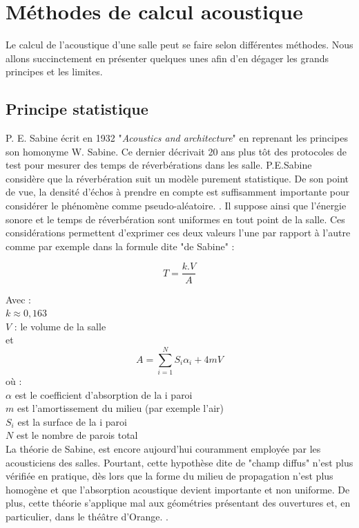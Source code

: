 \section{Méthodes de calcul acoustique} 
Le calcul de l'acoustique d'une salle peut se faire selon différentes méthodes. Nous allons succinctement en présenter quelques unes afin d'en dégager les grands principes et les limites.

	\subsection{Principe statistique}

P. E. Sabine écrit en 1932 "\textit{Acoustics and architecture}" en reprenant les principes son homonyme W. Sabine. Ce dernier décrivait 20 ans plus tôt des protocoles de test pour mesurer des temps de réverbérations dans les salle. P.E.Sabine considère que la réverbération suit un modèle purement statistique. De son point de vue, la densité d'échos à prendre en compte est suffisamment importante pour considérer le phénomène comme pseudo-aléatoire. \cite[p. 19]{Kandelman}. Il suppose ainsi que l’énergie sonore et le temps de réverbération sont uniformes en tout point de la salle. Ces considérations permettent d'exprimer ces deux valeurs l'une par rapport à l'autre comme par exemple dans la formule dite "de Sabine" : 

\begin{equation}
   	T = \frac{k.V}{A}
\end{equation}

Avec : \\
$k \approx 0,163$ \\
$V$ : le volume de la salle\\
et
\begin{equation}
   	A = \sum_{i=1}^N S_{i}\alpha_{i} + 4mV
\end{equation}
où : \\
$\alpha$ est le coefficient d'absorption de la i paroi \\
$m$ est l'amortissement du milieu (par exemple l'air) \\
$S_{i}$ est la surface de la i paroi \\
$N$ est le nombre de parois total \\

La théorie de Sabine, est encore aujourd'hui couramment employée par les acousticiens des salles. Pourtant, cette hypothèse dite de "champ diffus" n’est plus vérifiée en pratique, dès lors que la forme du milieu de propagation n’est plus homogène et que l’absorption acoustique devient importante et non uniforme. De plus, cette théorie s’applique mal aux géométries présentant des ouvertures et, en particulier, dans le théâtre d'Orange. \cite[p. 60]{picaut}.

